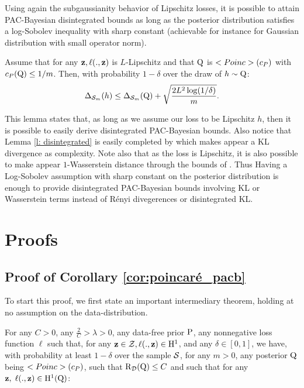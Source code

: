 \begin{noaddcontents}
    Using again the subgaussianity behavior of Lipschitz losses, it is possible to attain PAC-Bayesian disintegrated bounds as long as the posterior distribution satisfies a log-Sobolev inequality with sharp constant (achievable for instance for Gaussian distribution with small operator norm).
    
    \begin{lemma}
      \label{l: disintegrated}
      Assume that for any $\z, \ell(.,\z)$ is $L$-Lipschitz and that $\Q$ is $\Poinc(c_P)$ with $c_P(\Q)\leq 1/m$. Then, with probability $1-\delta$ over the draw of $h\sim\Q$:
      \[ \Delta_{\S_m}(h) \leq \Delta_{\S_m}(\Q) + \sqrt{\frac{2L^2\log(1/\delta)}{m}}.  \]
    \end{lemma}
    
    This lemma states that, as long as we assume our loss to be Lipschitz \wrt $h$, then it is possible to easily derive disintegrated PAC-Bayesian bounds. Also notice that Lemma \ref{l: disintegrated} is easily completed by  which makes appear a KL divergence as complexity. Note also that as the loss is Lipschitz, it is also possible to make appear $1$-Wasserstein distance through the bounds of . Thus Having a Log-Sobolev assumption with sharp constant on the posterior distribution is enough to provide disintegrated PAC-Bayesian bounds involving KL or Wasserstein terms instead of Rényi divegerences or disintegrated KL.
    
    \section{Proofs}
    \label{sec: proofs-chap-4}
    \subsection{Proof of Corollary \ref{cor:poincaré_pacb}}
        \label{sec:proof_poincaré_pacb}
        To start this proof, we first state an important intermediary theorem, holding at no assumption on the data-distribution.
      \begin{theorem}
        \label{th:poincaré-pacb}
        For any $C>0$, any $\frac{2}{C}>\lambda >0$, any data-free prior $\P$, any nonnegative loss function $\ell$ such that, for any $\z\in\mathcal{Z}, \ell(.,\z)\in \mathrm{H}^{1}$, and any $\delta\in [0,1]$, we have, with probability at least $1-\delta$ over the sample $\S$, for any $m>0$, any posterior $\Q$ being $\Poinc(c_P)$, such that $\Risk_\D(\Q)\leq C$ and such that for any $\z,\; \ell(.,\z)\in \mathrm{H}^{1}(\Q)$: 
    

\end{theorem}
\end{noaddcontents}
